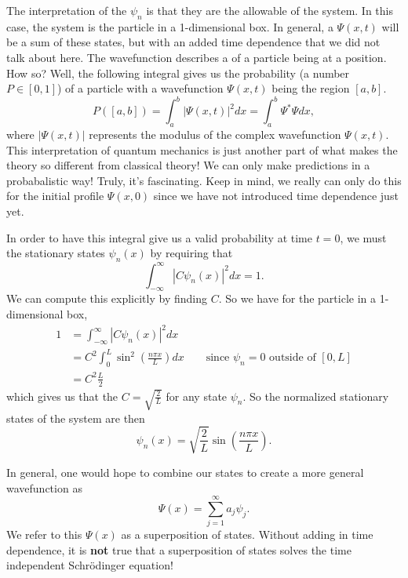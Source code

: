 The interpretation of the $\psi_n$ is that they are the allowable  of the system. In this case, the system is the particle in a 1-dimensional box. In general, a  $\Psi(x,t)$ will be a sum of these states, but with an added time dependence that we did not talk about here. The wavefunction describes a  of a particle being at a position.  How so? Well, the following integral gives us the probability (a number $P\in [0,1]$) of a particle with a wavefunction $\Psi(x,t)$ being the region $[a,b]$.
\[
P([a,b])=\int_a^b |\Psi(x,t)|^2 dx=\int_a^b \Psi^* \Psi dx,
\]
where $|\Psi(x,t) |$ represents the modulus of the complex wavefunction $\Psi(x,t)$. This interpretation of quantum mechanics is just another part of what makes the theory so different from classical theory! We can only make predictions in a probabalistic way! Truly, it's fascinating. Keep in mind, we really can only do this for the initial profile $\Psi(x,0)$ since we have not introduced time dependence just yet.

In order to have this integral give us a valid probability at time $t=0$, we must  the stationary states $\psi_n(x)$ by requiring that
\[
\int_{-\infty}^\infty |C\psi_n(x)|^2dx=1.
\]
We can compute this explicitly by finding $C$. So we have for the particle in a 1-dimensional box,
\begin{align*}
    1&= \int_{-\infty}^\infty |C\psi_n(x)|^2dx\\
    &= C^2\int_{0}^L \sin^2\left(\frac{n\pi x}{L}\right)dx \qquad \textrm{since $\psi_n=0$ outside of $[0,L]$}\\
    &= C^2 \frac{L}{2}
\end{align*}
which gives us that the  $C=\sqrt{\frac{2}{L}}$ for any state $\psi_n$. So the normalized stationary states of the system are then
\[
\boxed{\psi_n(x) = \sqrt{\frac{2}{L}}\sin\left(\frac{n\pi x}{L}\right).}
\]

In general, one would hope to combine our states to create a more general wavefunction as
\[
\Psi(x) = \sum_{j=1}^\infty a_j \psi_j.
\]
We refer to this $\Psi(x)$ as a superposition of states.  Without adding in time dependence, it is \textbf{not} true that a superposition of states solves the time independent Schr\"odinger equation!

